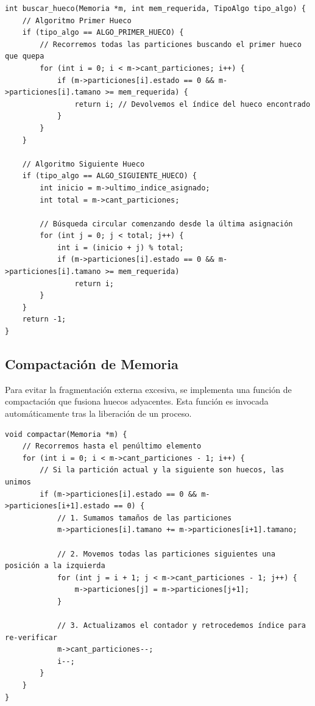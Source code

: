 \documentclass[11pt,a4paper]{article}
\begin{document}
\begin{lstlisting}[caption={Implementación de First Fit y Next Fit}, label={lst:buscar_hueco}]
int buscar_hueco(Memoria *m, int mem_requerida, TipoAlgo tipo_algo) {
    // Algoritmo Primer Hueco
    if (tipo_algo == ALGO_PRIMER_HUECO) {
        // Recorremos todas las particiones buscando el primer hueco que quepa
        for (int i = 0; i < m->cant_particiones; i++) {
            if (m->particiones[i].estado == 0 && m->particiones[i].tamano >= mem_requerida) {
                return i; // Devolvemos el índice del hueco encontrado
            }
        }
    }

    // Algoritmo Siguiente Hueco
    if (tipo_algo == ALGO_SIGUIENTE_HUECO) {
        int inicio = m->ultimo_indice_asignado;
        int total = m->cant_particiones;

        // Búsqueda circular comenzando desde la última asignación
        for (int j = 0; j < total; j++) {
            int i = (inicio + j) % total;
            if (m->particiones[i].estado == 0 && m->particiones[i].tamano >= mem_requerida)
                return i;
        }
    }
    return -1;
}
\end{lstlisting}

\subsection{Compactación de Memoria}

Para evitar la fragmentación externa excesiva, se implementa una función de compactación que fusiona huecos adyacentes. Esta función es invocada automáticamente tras la liberación de un proceso.

\begin{lstlisting}[caption={Función de Compactación de Huecos}, label={lst:compactar}]
void compactar(Memoria *m) {
    // Recorremos hasta el penúltimo elemento
    for (int i = 0; i < m->cant_particiones - 1; i++) {
        // Si la partición actual y la siguiente son huecos, las unimos
        if (m->particiones[i].estado == 0 && m->particiones[i+1].estado == 0) {
            // 1. Sumamos tamaños de las particiones
            m->particiones[i].tamano += m->particiones[i+1].tamano;
            
            // 2. Movemos todas las particiones siguientes una posición a la izquierda
            for (int j = i + 1; j < m->cant_particiones - 1; j++) {
                m->particiones[j] = m->particiones[j+1];
            }
            
            // 3. Actualizamos el contador y retrocedemos índice para re-verificar
            m->cant_particiones--;
            i--;
        }
    }
}
\end{lstlisting}
\end{document}
